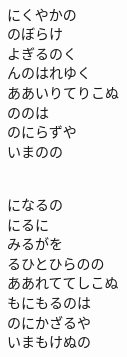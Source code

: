\documentclass[10pt,b5j]{tarticle} %
\begin{document}
\begin{enumerate}
\begin{minipage}[c]{\blocksize}
    \end{minipage}
    \begin{minipage}[c]{\blocksize}
        
        \vspace{\linespace}
        \item~\\
        にくやかの\\
        のぼらけ\\
        よぎるのく\\
        んのはれゆく\\
        ああいりてりこぬ\\
        ののは\\
        のにらずや\\
        いまのの
        
        \vspace{\linespace}
        \item~\\
        になるの\\
        にるに\\
        みるがを\\
        るひとひらのの\\
        ああれててしこぬ\\
        もにもるのは\\
        のにかざるや\\
        いまもけぬの
        
    \end{minipage}
    \begin{minipage}[c]{\blocksize}
        

\end{minipage}
\end{enumerate}
\end{document}
